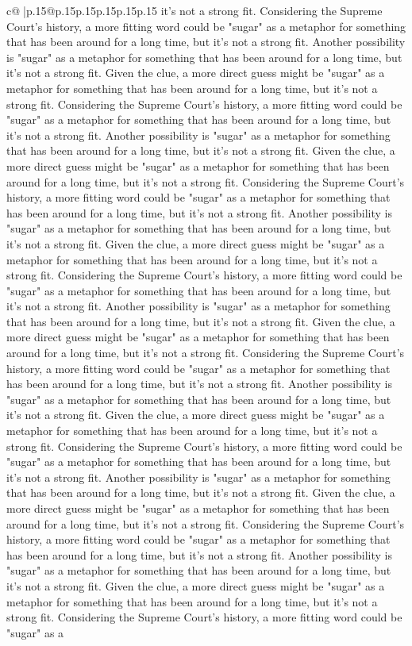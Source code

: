 \documentclass{article}
\begin{document}
{\begin{supertabular}{c@{$\;$}|p{.15\linewidth}@{}p{.15\linewidth}p{.15\linewidth}p{.15\linewidth}p{.15\linewidth}p{.15\linewidth}}
{{{it's not a strong fit. Considering the Supreme Court's history, a more fitting word could be "sugar" as a metaphor for something that has been around for a long time, but it's not a strong fit. Another possibility is "sugar" as a metaphor for something that has been around for a long time, but it's not a strong fit. Given the clue, a more direct guess might be "sugar" as a metaphor for something that has been around for a long time, but it's not a strong fit. Considering the Supreme Court's history, a more fitting word could be "sugar" as a metaphor for something that has been around for a long time, but it's not a strong fit. Another possibility is "sugar" as a metaphor for something that has been around for a long time, but it's not a strong fit. Given the clue, a more direct guess might be "sugar" as a metaphor for something that has been around for a long time, but it's not a strong fit. Considering the Supreme Court's history, a more fitting word could be "sugar" as a metaphor for something that has been around for a long time, but it's not a strong fit. Another possibility is "sugar" as a metaphor for something that has been around for a long time, but it's not a strong fit. Given the clue, a more direct guess might be "sugar" as a metaphor for something that has been around for a long time, but it's not a strong fit. Considering the Supreme Court's history, a more fitting word could be "sugar" as a metaphor for something that has been around for a long time, but it's not a strong fit. Another possibility is "sugar" as a metaphor for something that has been around for a long time, but it's not a strong fit. Given the clue, a more direct guess might be "sugar" as a metaphor for something that has been around for a long time, but it's not a strong fit. Considering the Supreme Court's history, a more fitting word could be "sugar" as a metaphor for something that has been around for a long time, but it's not a strong fit. Another possibility is "sugar" as a metaphor for something that has been around for a long time, but it's not a strong fit. Given the clue, a more direct guess might be "sugar" as a metaphor for something that has been around for a long time, but it's not a strong fit. Considering the Supreme Court's history, a more fitting word could be "sugar" as a metaphor for something that has been around for a long time, but it's not a strong fit. Another possibility is "sugar" as a metaphor for something that has been around for a long time, but it's not a strong fit. Given the clue, a more direct guess might be "sugar" as a metaphor for something that has been around for a long time, but it's not a strong fit. Considering the Supreme Court's history, a more fitting word could be "sugar" as a metaphor for something that has been around for a long time, but it's not a strong fit. Another possibility is "sugar" as a metaphor for something that has been around for a long time, but it's not a strong fit. Given the clue, a more direct guess might be "sugar" as a metaphor for something that has been around for a long time, but it's not a strong fit. Considering the Supreme Court's history, a more fitting word could be "sugar" as a }}}
\end{supertabular}}
\end{document}
